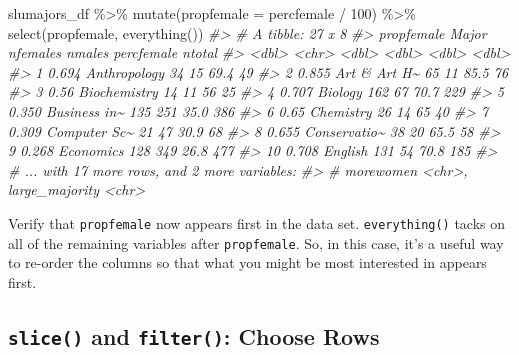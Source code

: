 \documentclass[
]{book}
\newenvironment{Shaded}{\begin{snugshade}}{\end{snugshade}}
\newcommand{\AttributeTok}[1]{\textcolor[rgb]{0.77,0.63,0.00}{#1}}
\newcommand{\CommentTok}[1]{\textcolor[rgb]{0.56,0.35,0.01}{\textit{#1}}}
\newcommand{\DecValTok}[1]{\textcolor[rgb]{0.00,0.00,0.81}{#1}}
\newcommand{\FunctionTok}[1]{\textcolor[rgb]{0.00,0.00,0.00}{#1}}
\newcommand{\NormalTok}[1]{#1}
\newcommand{\SpecialCharTok}[1]{\textcolor[rgb]{0.00,0.00,0.00}{#1}}
\begin{document}
\begin{Shaded}
\begin{Highlighting}[]
\NormalTok{slumajors\_df }\SpecialCharTok{\%\textgreater{}\%} \FunctionTok{mutate}\NormalTok{(}\AttributeTok{propfemale =}\NormalTok{ percfemale }\SpecialCharTok{/} \DecValTok{100}\NormalTok{) }\SpecialCharTok{\%\textgreater{}\%}
  \FunctionTok{select}\NormalTok{(propfemale, }\FunctionTok{everything}\NormalTok{())}
\CommentTok{\#\textgreater{} \# A tibble: 27 x 8}
\CommentTok{\#\textgreater{}    propfemale Major        nfemales nmales percfemale ntotal}
\CommentTok{\#\textgreater{}         \textless{}dbl\textgreater{} \textless{}chr\textgreater{}           \textless{}dbl\textgreater{}  \textless{}dbl\textgreater{}      \textless{}dbl\textgreater{}  \textless{}dbl\textgreater{}}
\CommentTok{\#\textgreater{}  1      0.694 Anthropology       34     15       69.4     49}
\CommentTok{\#\textgreater{}  2      0.855 Art \& Art H\textasciitilde{}       65     11       85.5     76}
\CommentTok{\#\textgreater{}  3      0.56  Biochemistry       14     11       56       25}
\CommentTok{\#\textgreater{}  4      0.707 Biology           162     67       70.7    229}
\CommentTok{\#\textgreater{}  5      0.350 Business in\textasciitilde{}      135    251       35.0    386}
\CommentTok{\#\textgreater{}  6      0.65  Chemistry          26     14       65       40}
\CommentTok{\#\textgreater{}  7      0.309 Computer Sc\textasciitilde{}       21     47       30.9     68}
\CommentTok{\#\textgreater{}  8      0.655 Conservatio\textasciitilde{}       38     20       65.5     58}
\CommentTok{\#\textgreater{}  9      0.268 Economics         128    349       26.8    477}
\CommentTok{\#\textgreater{} 10      0.708 English           131     54       70.8    185}
\CommentTok{\#\textgreater{} \# ... with 17 more rows, and 2 more variables:}
\CommentTok{\#\textgreater{} \#   morewomen \textless{}chr\textgreater{}, large\_majority \textless{}chr\textgreater{}}
\end{Highlighting}
\end{Shaded}

Verify that \texttt{propfemale} now appears first in the data set. \texttt{everything()} tacks on all of the remaining variables after \texttt{propfemale}. So, in this case, it's a useful way to re-order the columns so that what you might be most interested in appears first.

\hypertarget{slice-and-filter-choose-rows}{%
\subsection{\texorpdfstring{\texttt{slice()} and \texttt{filter()}: Choose Rows}{slice() and filter(): Choose Rows}}\label{slice-and-filter-choose-rows}}
\end{document}
